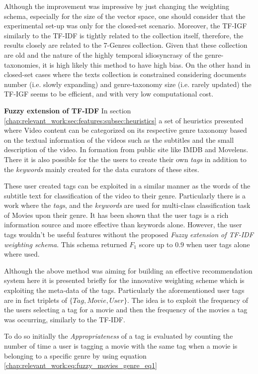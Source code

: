 Although the improvement was impressive by just changing the weighting schema, especially for  the size of the vector space, one should consider that the experimental set-up was only for the closed-set scenario. Moreover, the TF-IGF similarly to the TF-IDF is tightly related to the collection itself, therefore, the results closely are related to the 7-Genres collection. Given that these collection are old and the nature of the highly temporal idiosyncrasy of the genre-taxonomies, it is high likely this method to have high bias. On the other hand in closed-set cases where the texts collection is constrained considering documents number (i.e. slowly expanding) and genre-taxonomy size (i.e. rarely updated) the TF-IGF seems to be efficient, and with very low computational cost.  

\textbf{Fuzzy extension of TF-IDF} In section \ref{chap:relevant_work:sec:features:subsec:heuristics} a set of heuristics presented where Video content can be categorized on its respective genre taxonomy based on the textual information of the videos such as the subtitles and the small description of the video. In formation from public site like IMDB and Movelens. There it is also possible for the the users to create their own \textit{tags} in addition to the \textit{keywords} mainly created for the data curators of these sites. 

These user created tags can be exploited in a similar manner as the words of the subtitle text for classification of the video to their genre. Particularly there is a work where the \textit{tags}, and the \textit{keywords} are used for multi-class classification task of Movies upon their genre. It has been shown that the user tags is a rich information source and more effective than keywords alone. However, the user tags wouldn't be useful features without the proposed \textit{Fuzzy extension of TF-IDF weighting schema}.  This schema returned $F_{1}$ score up to $0.9$ when user tags alone where used.

Although the above method was aiming for building an effective recommendation system here it is presented briefly for the innovative weighting scheme which is exploiting the meta-data of the tags. Particularly the aforementioned user tags are in fact triplets of  $\{Tag, Movie, User \}$. The idea is to exploit the frequency of the users selecting a tag for a movie and then the frequency of the movies a tag was occurring, similarly to the TF-IDF.

To do so initially the \textit{Appropriateness} of a tag is evaluated by counting the number of time a user is tagging a movie with the same tag when a movie is belonging to a specific genre by using equation \ref{chap:relevant_work:eq:fuzzy_movies_genre_eq1}

